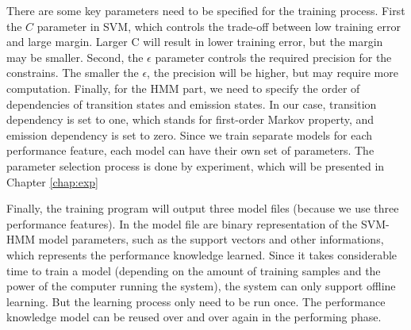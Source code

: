There are some key parameters need to be specified for the training process. First the $C$ parameter in SVM, which controls the trade-off between low training error and large margin. Larger C will result in lower training error, but the margin may be smaller. Second, the $\epsilon$ parameter controls the required precision for the constrains. The smaller the $\epsilon$, the precision will be higher, but may require more computation. Finally, for the HMM part, we need to specify the order of dependencies of transition states and emission states. In our case, transition dependency is set to one, which stands for first-order Markov property, and emission dependency is set to zero. Since we train separate models for each performance feature, each model can have their own set of parameters. The parameter selection process is done by experiment, which will be presented in Chapter \ref{chap:exp}

Finally, the training program will output three model files (because we use three performance features). In the model file are binary representation of the SVM-HMM model parameters, such as the support vectors and other informations, which represents the performance knowledge learned.  Since it takes considerable time to train a model (depending on the amount of training samples and the power of the computer running the system), the system can only support offline learning. But the learning process only need to be run once. The performance knowledge model can be reused over and over again in the performing phase.



